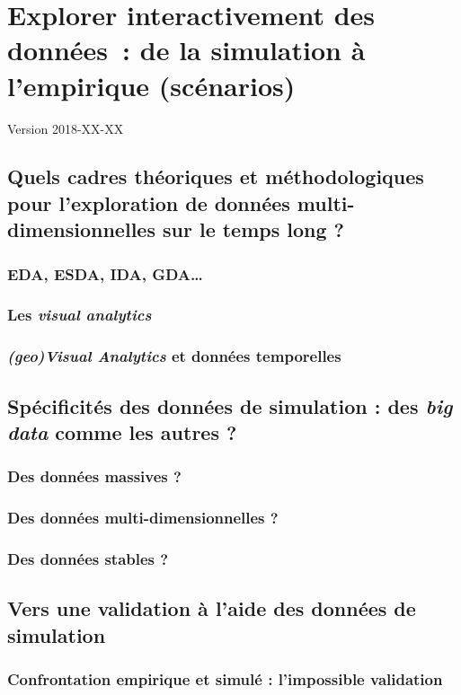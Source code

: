 \chapter{Explorer interactivement des données : de la simulation à l'empirique (scénarios)}
\label{chap:chap7}
\begin{center}
	{\large Version 2018-XX-XX}
\end{center}
\minitoc

\section{Quels cadres théoriques et méthodologiques pour l'exploration de données multi-dimensionnelles sur le temps long ?}

\subsection{EDA, ESDA, IDA, GDA\dots}
\subsection{Les \textit{visual analytics}}
\subsection{\textit{(geo)Visual Analytics} et données temporelles}

\section{Spécificités des données de simulation : des \textit{big data} comme les autres ?}
\subsection{Des données massives ?}
\subsection{Des données multi-dimensionnelles ?}
\subsection{Des données stables ?}

\section{Vers une validation à l'aide des données de simulation}
\subsection{Confrontation empirique et simulé : l'impossible validation}
